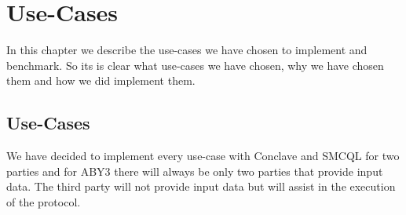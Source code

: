 \chapter{Use-Cases}
In this chapter we describe the use-cases we have chosen to implement and benchmark. So its is clear what use-cases we have chosen, why we have chosen them and how we did implement them.  
 
\section{Use-Cases}



\cite{johnson2017practical}


















We have decided to implement every use-case with Conclave and SMCQL for two parties and for ABY3 there will always be only two parties that provide input data. The third party will not provide input data but will assist in the execution of the protocol.
